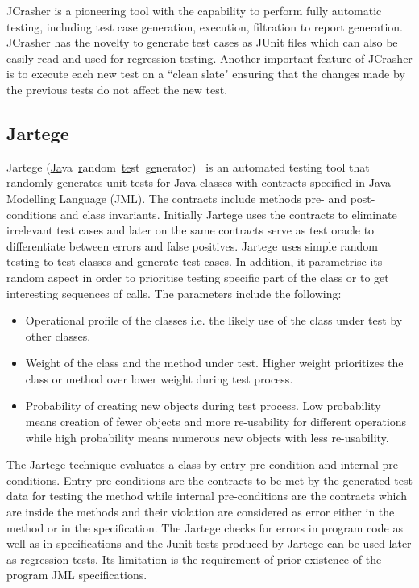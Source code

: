 \noindent JCrasher is a pioneering tool with the capability to perform fully automatic testing, including test case generation, execution, filtration to report generation. JCrasher has the novelty to generate test cases as JUnit files which can also be easily read and used for regression testing. Another important feature of JCrasher is to execute each new test on a ``clean slate" ensuring that the changes made by the previous tests do not affect the new test.  



\subsection{Jartege}
Jartege (\uline{Ja}va~\uline{r}andom~\uline{te}st~\uline{ge}nerator)~\cite{Oriat2004} is an automated testing tool that randomly generates unit tests for Java classes with contracts specified in Java Modelling Language (JML). The contracts include methods pre- and post-conditions and class invariants. Initially Jartege uses the contracts to eliminate irrelevant test cases and later on the same contracts serve as test oracle to differentiate between errors and false positives. Jartege uses simple random testing to test classes and generate test cases. In addition, it parametrise its random aspect in order to prioritise testing specific part of the class or to get interesting sequences of calls. The parameters include the following: 
\begin{itemize}
\item Operational profile of the classes i.e. the likely use of the class under test by other classes.  
\item Weight of the class and the method under test. Higher weight prioritizes the class or method over lower weight during test process. 
\item Probability of creating new objects during test process. Low probability means creation of fewer objects and more re-usability for different operations while high probability means numerous new objects with less re-usability.
\end{itemize}

\noindent The Jartege technique evaluates a class by entry pre-condition and internal pre-conditions. Entry pre-conditions are the contracts to be met by the generated test data for testing the method while internal pre-conditions are the contracts which are inside the methods and their violation are considered as error either in the method or in the specification. The Jartege checks for errors in program code as well as in specifications and the Junit tests produced by Jartege can be used later as regression tests. Its limitation is the requirement of prior existence of the program JML specifications.

